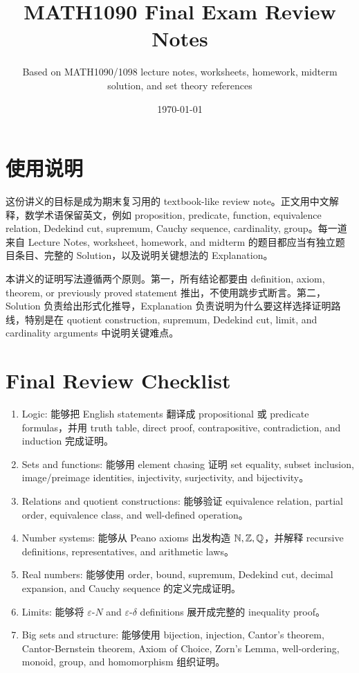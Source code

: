 \documentclass[11pt,openany,fontset=none]{ctexbook}
\title{MATH1090 Final Exam Review Notes}
\author{Based on MATH1090/1098 lecture notes, worksheets, homework, midterm solution, and set theory references}
\date{\today}
\begin{document}
\frontmatter
\maketitle
\tableofcontents

\chapter*{使用说明}

这份讲义的目标是成为期末复习用的 textbook-like review note。正文用中文解释，数学术语保留英文，例如 proposition, predicate, function, equivalence relation, Dedekind cut, supremum, Cauchy sequence, cardinality, group。每一道来自 Lecture Notes, worksheet, homework, and midterm 的题目都应当有独立题目条目、完整的 Solution，以及说明关键想法的 Explanation。

本讲义的证明写法遵循两个原则。第一，所有结论都要由 definition, axiom, theorem, or previously proved statement 推出，不使用跳步式断言。第二，Solution 负责给出形式化推导，Explanation 负责说明为什么要这样选择证明路线，特别是在 quotient construction, supremum, Dedekind cut, limit, and cardinality arguments 中说明关键难点。

\mainmatter










\backmatter

\chapter{Final Review Checklist}

\begin{enumerate}[label=\arabic*.]
  \item Logic: 能够把 English statements 翻译成 propositional 或 predicate formulas，并用 truth table, direct proof, contrapositive, contradiction, and induction 完成证明。
  \item Sets and functions: 能够用 element chasing 证明 set equality, subset inclusion, image/preimage identities, injectivity, surjectivity, and bijectivity。
  \item Relations and quotient constructions: 能够验证 equivalence relation, partial order, equivalence class, and well-defined operation。
  \item Number systems: 能够从 Peano axioms 出发构造 \(\mathbb{N},\mathbb{Z},\mathbb{Q}\)，并解释 recursive definitions, representatives, and arithmetic laws。
  \item Real numbers: 能够使用 order, bound, supremum, Dedekind cut, decimal expansion, and Cauchy sequence 的定义完成证明。
  \item Limits: 能够将 \(\varepsilon\)-\(N\) and \(\varepsilon\)-\(\delta\) definitions 展开成完整的 inequality proof。
  \item Big sets and structure: 能够使用 bijection, injection, Cantor's theorem, Cantor-Bernstein theorem, Axiom of Choice, Zorn's Lemma, well-ordering, monoid, group, and homomorphism 组织证明。
\end{enumerate}
\end{document}
